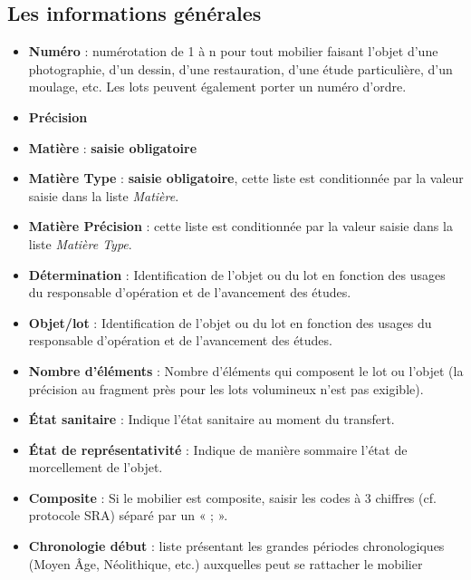 \documentclass[letterpaper,10pt,french]{sphinxmanual}
\begin{document}
\subsection{Les informations générales}
\label{manuel/formulaire_mobilier:les-informations-generales}\begin{itemize}
\item {} 
\textbf{Numéro} : numérotation de 1 à n pour tout mobilier faisant l’objet d’une photographie, d’un dessin, d’une restauration, d’une étude particulière, d’un moulage, etc. Les lots peuvent également porter un numéro d’ordre.

\item {} 
\textbf{Précision}

\item {} 
\textbf{Matière} : \textbf{saisie obligatoire}

\item {} 
\textbf{Matière Type} : \textbf{saisie obligatoire}, cette liste est conditionnée par la valeur saisie dans la liste \emph{Matière}.

\item {} 
\textbf{Matière Précision} : cette liste est conditionnée par la valeur saisie dans la liste \emph{Matière Type}.

\item {} 
\textbf{Détermination} : Identification de l’objet ou du lot en fonction des usages du responsable d’opération et de l’avancement des études.

\item {} 
\textbf{Objet/lot} : Identification de l’objet ou du lot en fonction des usages du responsable d’opération et de l’avancement des études.

\item {} 
\textbf{Nombre d'éléments} : Nombre d'éléments qui composent le lot ou l’objet (la précision au fragment près pour les lots volumineux n’est pas exigible).

\item {} 
\textbf{État sanitaire} : Indique l'état sanitaire au moment du transfert.

\item {} 
\textbf{État de représentativité} : Indique de manière sommaire l'état de morcellement de l'objet.

\item {} 
\textbf{Composite} : Si le mobilier est composite, saisir les codes à 3 chiffres (cf. protocole SRA) séparé par un « ; ».

\item {} 
\textbf{Chronologie début} : liste présentant les grandes périodes chronologiques (Moyen Âge, Néolithique, etc.) auxquelles peut se rattacher le mobilier


\end{itemize}
\end{document}
